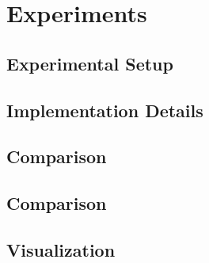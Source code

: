 \section{Experiments}
\subsection{Experimental Setup}
\subsection{Implementation Details}
\subsection{Comparison}
\subsection{Comparison}





\subsection{Visualization}